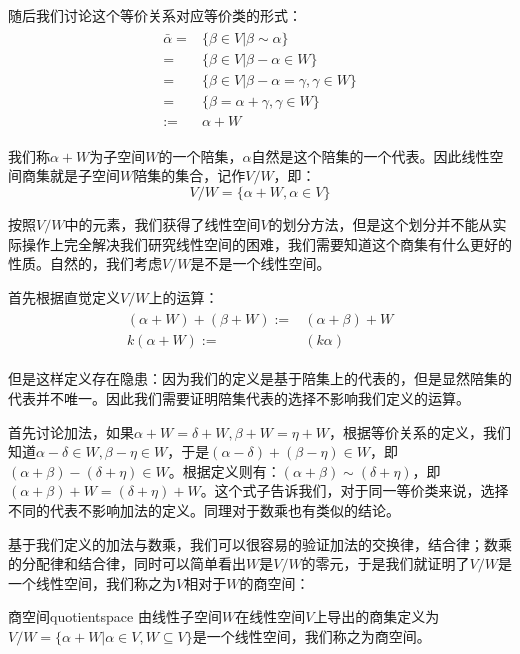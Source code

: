    随后我们讨论这个等价关系对应等价类的形式：
   \begin{align}
       \begin{split}
           \bar{\alpha}=&\{\beta\in V|\beta\sim\alpha\}\\
           =&\{\beta\in V|\beta-\alpha\in W\}\\
           =&\{\beta\in V|\beta-\alpha=\gamma,\gamma\in W\}\\
           =&\{\beta=\alpha+\gamma,\gamma\in W\}\\
           :=& \alpha + W
       \end{split}
   \end{align}
   
   我们称$\alpha+ W$为子空间$W$的一个陪集，$\alpha$自然是这个陪集的一个代表。因此线性空间商集就是子空间$W$陪集的集合，记作$V/W$，即：
   \begin{equation}
       V/W=\{\alpha+W,\alpha\in V\}
   \end{equation}
   
   按照$V/W$中的元素，我们获得了线性空间$V$的划分方法，但是这个划分并不能从实际操作上完全解决我们研究线性空间的困难，我们需要知道这个商集有什么更好的性质。自然的，我们考虑$V/W$是不是一个线性空间。
   
   首先根据直觉定义$V/W$上的运算：
   \begin{align}
   \begin{split}
       (\alpha +W)+(\beta+W):=&(\alpha+\beta)+W\\
       k(\alpha+W):=& (k\alpha)
   \end{split}
   \end{align}
   
   但是这样定义存在隐患：因为我们的定义是基于陪集上的代表的，但是显然陪集的代表并不唯一。因此我们需要证明陪集代表的选择不影响我们定义的运算。
   
   首先讨论加法，如果$\alpha +W=\delta +W,\beta+W=\eta+W$，根据等价关系的定义，我们知道$\alpha-\delta\in W,\beta-\eta\in W$，于是$(\alpha-\delta)+(\beta-\eta)\in W$，即$(\alpha+\beta)-(\delta+\eta)\in W$。根据定义则有：$(\alpha+\beta)\sim(\delta+\eta)$，即$(\alpha+\beta)+W=(\delta+\eta)+W$。这个式子告诉我们，对于同一等价类来说，选择不同的代表不影响加法的定义。同理对于数乘也有类似的结论。
   
   基于我们定义的加法与数乘，我们可以很容易的验证加法的交换律，结合律；数乘的分配律和结合律，同时可以简单看出$W$是$V/W$的零元，于是我们就证明了$V/W$是一个线性空间，我们称之为$V$相对于$W$的商空间：
   \begin{definition}{商空间}{quotientspace}
   由线性子空间$W$在线性空间$V$上导出的商集定义为$V/W=\{\alpha+W|\alpha\in V,W\subseteq V\}$是一个线性空间，我们称之为商空间。
   \end{definition}
   
